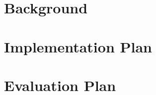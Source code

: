 \documentclass[11pt]{article}
\begin{document}

\newpage
\thispagestyle{plain}
\mbox{}
\section {Background}
\label{sec:background}


\newpage
\thispagestyle{plain}
\mbox{}
\section {Implementation Plan}
\label{sec:implementationPlan}


\newpage
\thispagestyle{plain}
\mbox{}
\section {Evaluation Plan}
\label{sec:evaluationPlan}


\newpage
\thispagestyle{plain}
\mbox{}



\end{document}
